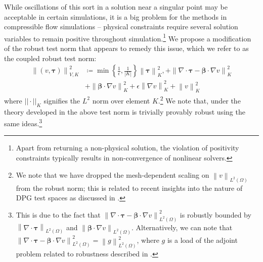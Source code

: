 \documentclass[letterpaper]{article}
\def\btau{\boldsymbol\tau}
\def\bbeta{\boldsymbol\beta}
\newcommand{\norm}[1]{\left\| #1 \right\|}
\newcommand{\LRp}[1]{\left( #1 \right)}
\newcommand{\Grad} {\ensuremath{\nabla}}
\renewcommand{\L}{L^2\LRp{\Omega}}
\newcommand{\grad}{\nabla}
\renewcommand{\div}{\grad \cdot}
\begin{document}
While oscillations of this sort in a solution near a singular point may be
acceptable in certain simulations, it is a big problem for the methods in
compressible flow simulations -- physical constraints require several solution
variables to remain positive throughout simulation.\footnote{Apart from
returning a non-physical solution, the violation of positivity constraints
typically results in non-convergence of nonlinear solvers.}  We propose a
modification of the robust test norm that appears to remedy this issue, which
we refer to as the coupled robust test norm:
\begin{align}
\norm{\LRp{v,\btau}}_{V,K}^2 &\coloneqq
\min\left\{\frac{1}{\epsilon},\frac{1}{|K|}\right\}\norm{\btau}_K^2,
+ \norm{\div \btau - \bbeta\cdot\Grad v}_K^2 \\
&+\norm{\bbeta\cdot \Grad v}_K^2
+ \epsilon\norm{\Grad v}_K^2
+ \norm{v}^2_K
\end{align}
where $||\cdot||_K$ signifies the $L^2$ norm over element $K$.\footnote{
We note that we have dropped the
mesh-dependent scaling on $\norm{v}_{\L}$ from the robust norm; this is related
to recent insights into the nature of DPG test spaces as discussed in
\cite{Chan2013}.
}
We note that, under the
theory developed in \cite{ChanHeuerThanhDemkowicz2012}
the above test norm is
trivially provably robust using the same ideas.\footnote{This is due to the
fact that $\norm{\div \btau - \bbeta\cdot\Grad v}_{\L}^2$ is robustly bounded by
$\norm{\div \btau}_{\L}$ and $\norm{\bbeta\cdot\Grad v}_{\L}$.  Alternatively, we
can note that $\norm{\div \btau - \bbeta\cdot\Grad v}_{\L}^2 = \norm{g}_{\L}^2$,
where $g$ is a load of the adjoint problem related to robustness described in
\cite{ChanHeuerThanhDemkowicz2012}.
}
\end{document}
